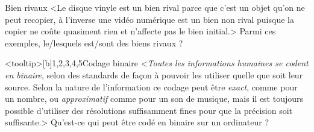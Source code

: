 \begin{quiz}[title={Données et traitements}]
\vspace{-\baselineskip}
\begin{quizquestion}[b]{1}{2}{Bien rivaux}
<Le disque vinyle est un bien rival parce que c'est un objet qu'on ne peut recopier, à l'inverse une vidéo numérique est un bien non rival puisque la copier ne coûte quasiment rien et n'affecte pas le bien initial.>
Parmi ces exemples, le/lesquels est/sont des biens rivaux ?
\end{quizquestion}

\begin{quizquestion}<tooltip>[b]{1,2,3,4,5}{}{Codage binaire}
<\textit{Toutes les informations humaines se codent en binaire}, selon des standards de façon à pouvoir les utiliser quelle que soit leur source. Selon la nature de l'information ce codage peut être \textit{exact}, comme pour un nombre, ou \textit{approximatif} comme pour un son de musique, mais il est toujours possible d'utiliser des résolutions suffisamment fines pour que la précision soit suffisante.>
Qu’est-ce qui peut être codé en binaire sur un ordinateur ?
\end{quizquestion}


\end{quiz}
